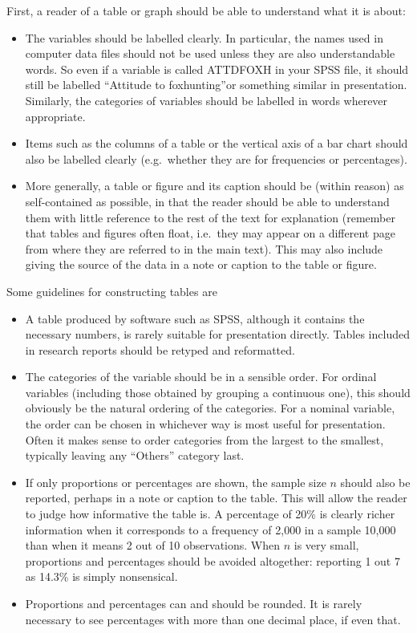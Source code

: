 \documentclass[11pt,a4paper,openany]{book}
\begin{document}
First, a reader of a table or graph should be able to understand what it
is about:

\begin{itemize}
\item
  The variables should be labelled clearly. In particular, the names
  used in computer data files should not be used unless they are also
  understandable words. So even if a variable is called ATTDFOXH in your
  SPSS file, it should still be labelled ``Attitude to foxhunting''or
  something similar in presentation. Similarly, the categories of
  variables should be labelled in words wherever appropriate.
\item
  Items such as the columns of a table or the vertical axis of a bar
  chart should also be labelled clearly (e.g.~whether they are for
  frequencies or percentages).
\item
  More generally, a table or figure and its caption should be (within
  reason) as self-contained as possible, in that the reader should be
  able to understand them with little reference to the rest of the text
  for explanation (remember that tables and figures often float,
  i.e.~they may appear on a different page from where they are referred
  to in the main text). This may also include giving the source of the
  data in a note or caption to the table or figure.
\end{itemize}

Some guidelines for constructing tables are

\begin{itemize}
\item
  A table produced by software such as SPSS, although it contains the
  necessary numbers, is rarely suitable for presentation directly.
  Tables included in research reports should be retyped and reformatted.
\item
  The categories of the variable should be in a sensible order. For
  ordinal variables (including those obtained by grouping a continuous
  one), this should obviously be the natural ordering of the categories.
  For a nominal variable, the order can be chosen in whichever way is
  most useful for presentation. Often it makes sense to order categories
  from the largest to the smallest, typically leaving any ``Others''
  category last.
\item
  If only proportions or percentages are shown, the sample size \(n\)
  should also be reported, perhaps in a note or caption to the table.
  This will allow the reader to judge how informative the table is. A
  percentage of 20\% is clearly richer information when it corresponds
  to a frequency of 2,000 in a sample 10,000 than when it means 2 out of
  10 observations. When \(n\) is very small, proportions and percentages
  should be avoided altogether: reporting 1 out 7 as 14.3\% is simply
  nonsensical.
\item
  Proportions and percentages can and should be rounded. It is rarely
  necessary to see percentages with more than one decimal place, if even
  that.
\end{itemize}
\end{document}
